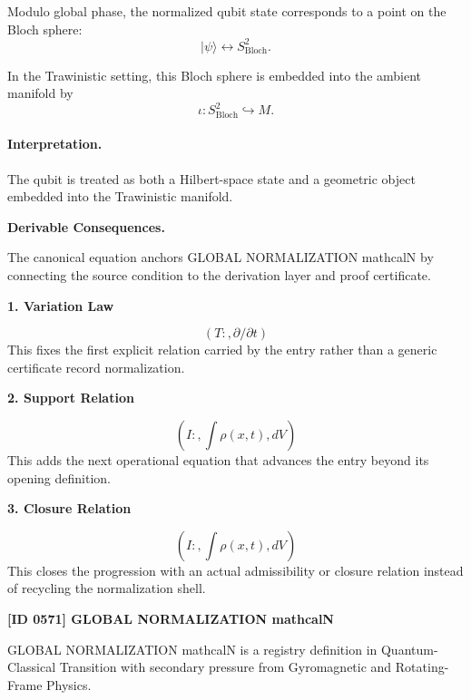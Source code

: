 Modulo global phase, the normalized qubit state corresponds to a point on the Bloch sphere:
\begin{equation}
|\psi\rangle \longleftrightarrow S^2_{\mathrm{Bloch}} .
\end{equation}

In the Trawinistic setting, this Bloch sphere is embedded into the ambient manifold by
\begin{equation}
\boxed{
\iota:S^2_{\mathrm{Bloch}}\hookrightarrow M .
}
\end{equation}

\paragraph{Interpretation.}
The qubit is treated as both a Hilbert-space state and a geometric object embedded into the Trawinistic manifold.

\par\vspace{0.35em}
\noindent\textbf{Derivable Consequences.}\quad
\begingroup
\footnotesize
\raggedright
The canonical equation anchors GLOBAL NORMALIZATION mathcalN by connecting the source condition to the derivation layer and proof certificate.
\par\endgroup

\noindent\textbf{1. Variation Law}\par
\[
(T:,\partial/\partial t)
\]
\noindent This fixes the first explicit relation carried by the entry rather than a generic certificate record normalization.\par
\noindent\textbf{2. Support Relation}\par
\[
(I:,\int \rho(x,t),dV)
\]
\noindent This adds the next operational equation that advances the entry beyond its opening definition.\par
\noindent\textbf{3. Closure Relation}\par
\[
(I:,\int \rho(x,t),dV)
\]
\noindent This closes the progression with an actual admissibility or closure relation instead of recycling the normalization shell.\par

\clearpage
\noindent\textbf{[ID 0571] GLOBAL NORMALIZATION mathcalN}\par
\vspace{0.35em}
\begingroup\small
{}
GLOBAL NORMALIZATION mathcalN is a registry definition in Quantum-Classical Transition with secondary pressure from Gyromagnetic and Rotating-Frame Physics.

